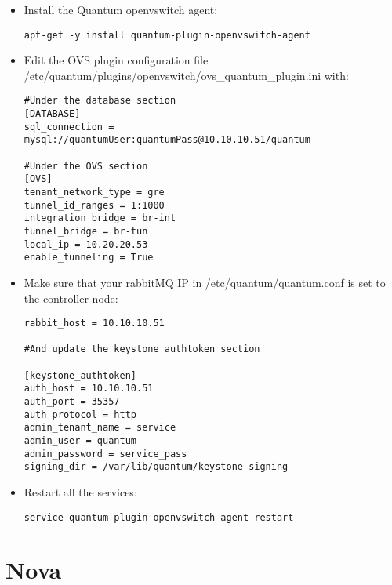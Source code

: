 \begin{itemize}
\item Install the Quantum openvswitch agent:

\begin{verbatim}
apt-get -y install quantum-plugin-openvswitch-agent
\end{verbatim}


\item Edit the OVS plugin configuration file \slash etc\slash quantum\slash plugins\slash openvswitch\slash ovs\_quantum\_plugin.ini with:

\begin{verbatim}
#Under the database section
[DATABASE]
sql_connection = mysql://quantumUser:quantumPass@10.10.10.51/quantum

#Under the OVS section
[OVS]
tenant_network_type = gre
tunnel_id_ranges = 1:1000
integration_bridge = br-int
tunnel_bridge = br-tun
local_ip = 10.20.20.53
enable_tunneling = True
\end{verbatim}


\item Make sure that your rabbitMQ IP in \slash etc\slash quantum\slash quantum.conf is set to the controller node:

\begin{verbatim}
rabbit_host = 10.10.10.51

#And update the keystone_authtoken section

[keystone_authtoken]
auth_host = 10.10.10.51
auth_port = 35357
auth_protocol = http
admin_tenant_name = service
admin_user = quantum
admin_password = service_pass
signing_dir = /var/lib/quantum/keystone-signing
\end{verbatim}


\item Restart all the services:

\begin{verbatim}
service quantum-plugin-openvswitch-agent restart
\end{verbatim}


\end{itemize}

\section{Nova}
\label{nova}


